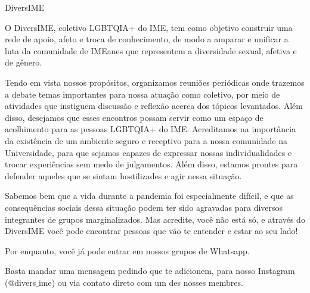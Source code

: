 \begin{subsecao}{DiversIME}

O DiversIME, coletivo LGBTQIA+ do IME, tem como objetivo construir uma rede de
apoio, afeto e troca de conhecimento, de modo a amparar e unificar a luta da
comunidade de IMEanes que representem a diversidade sexual, afetiva e de gênero. 

Tendo em vista nossos propósitos, organizamos reuniões periódicas onde trazemos
a debate temas importantes para nossa atuação como coletivo, por meio de
atividades que instiguem discussão e reflexão acerca dos tópicos levantados.
Além disso, desejamos que esses encontros possam servir como um espaço de
acolhimento para as pessoas LGBTQIA+ do IME. Acreditamos na importância da
existência de um ambiente seguro e receptivo para a nossa comunidade na
Universidade, para que sejamos capazes de expressar nossas individualidades
e trocar experiências sem medo de julgamentos. Além disso, estamos prontes
para defender aqueles que se sintam hostilizades e agir nessa situação. 

Sabemos bem que a vida durante a pandemia foi especialmente difícil, e que as 
consequências sociais dessa situação podem ter sido agravadas para diversos integrantes
de grupos marginalizados. Mas acredite, você não está só, e através do DiversIME
você pode encontrar pessoas que vão te entender e estar ao seu lado!

Por enquanto, você já pode entrar em nossos grupos de Whatsapp.

Basta mandar uma mensagem pedindo que te adicionem, para nosso Instagram
(@divers$\_$ime) ou via contato direto com um des nosses membres.

\end{subsecao}
